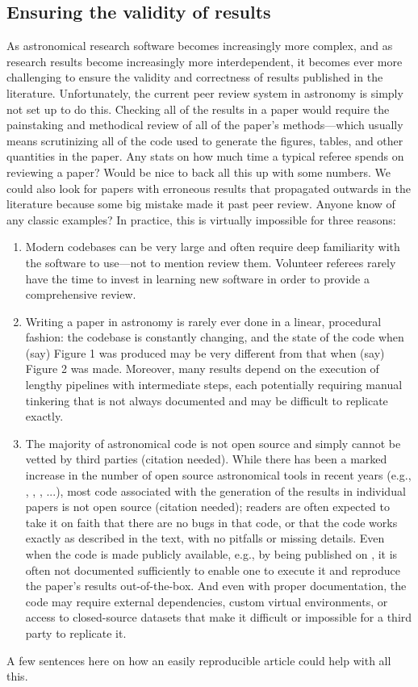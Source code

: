 \documentclass{aastex631}
\newcommand\xxx[1]{{\color{red}#1}}
\newcommand\needscite{{\color{red}(citation needed)}}
\begin{document}
\subsection{Ensuring the validity of results}
\label{sec:args:validity}
As astronomical research software becomes increasingly more complex, and as research results become increasingly more interdependent, it becomes ever more challenging to ensure the validity and correctness of results published in the literature. 
Unfortunately, the current peer review system in astronomy is simply not set up to do this.
Checking all of the results in a paper would require the painstaking and methodical review of all of the paper's methods---which usually means scrutinizing all of the code used to generate the figures, tables, and other quantities in the paper. 
%
\xxx{Any stats on how much time a typical referee spends on reviewing a paper? Would be nice to back all this up with some numbers.}
%
\xxx{We could also look for papers with erroneous results that propagated outwards in the literature because some big mistake made it past peer review. Anyone know of any classic examples?}
%
In practice, this is virtually impossible for three reasons:
%
\begin{enumerate}
    \item Modern codebases can be very large and often require deep familiarity with the software to use---not to mention review them. Volunteer referees rarely have the time to invest in learning new software in order to provide a comprehensive review.
    \item  Writing a paper in astronomy is rarely ever done in a linear, procedural fashion: the codebase is constantly changing, and the state of the code when (say) Figure 1 was produced may be very different from that when (say) Figure 2 was made. 
    Moreover, many results depend on the execution of lengthy pipelines with intermediate steps, each potentially requiring manual tinkering that is not always documented and may be difficult to replicate exactly.
    \item The majority of astronomical code is not open source and simply cannot be vetted by third parties \needscite. 
    While there has been a marked increase in the number of open source astronomical tools in recent years (e.g., \astropy, \exoplanet, \emcee, \exofast...), most code associated with the generation of the results in individual papers is not open source \needscite; readers are often expected to take it on faith that there are no bugs in that code, or that the code works exactly as described in the text, with no pitfalls or missing details. 
    Even when the code is made publicly available, e.g., by being published on \GitHub, it is often not documented sufficiently to enable one to execute it and reproduce the paper's results out-of-the-box. 
    And even with proper documentation, the code may require external dependencies, custom virtual environments, or access to closed-source datasets that make it difficult or impossible for a third party to replicate it.
\end{enumerate}
%
\xxx{A few sentences here on how an easily reproducible article could help with all this.}
\end{document}
